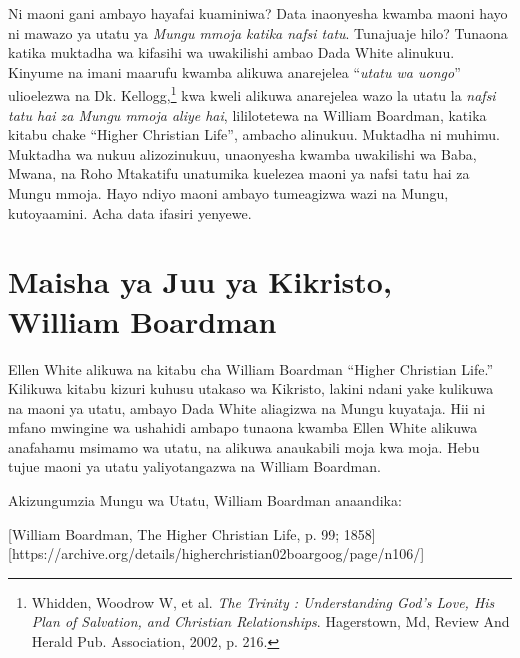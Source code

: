 Ni maoni gani ambayo hayafai kuaminiwa? Data inaonyesha kwamba maoni hayo ni mawazo ya utatu ya \textit{Mungu mmoja katika nafsi tatu}. Tunajuaje hilo? Tunaona katika muktadha wa kifasihi wa uwakilishi ambao Dada White alinukuu. Kinyume na imani maarufu kwamba alikuwa anarejelea “\textit{utatu wa uongo}” ulioelezwa na Dk. Kellogg,\footnote{Whidden, Woodrow W, et al. \textit{The Trinity : Understanding God's Love, His Plan of Salvation, and Christian Relationships}. Hagerstown, Md, Review And Herald Pub. Association, 2002, p. 216.} kwa kweli alikuwa anarejelea wazo la utatu la \textit{nafsi tatu hai za Mungu mmoja aliye hai}, lililotetewa na William Boardman, katika kitabu chake “Higher Christian Life”, ambacho alinukuu. Muktadha ni muhimu. Muktadha wa nukuu alizozinukuu, unaonyesha kwamba uwakilishi wa Baba, Mwana, na Roho Mtakatifu unatumika kuelezea maoni ya nafsi tatu hai za Mungu mmoja. Hayo ndiyo maoni ambayo tumeagizwa wazi na Mungu, kutoyaamini. Acha data ifasiri yenyewe.

\section*{Maisha ya Juu ya Kikristo, William Boardman}

Ellen White alikuwa na kitabu cha William Boardman “Higher Christian Life.” Kilikuwa kitabu kizuri kuhusu utakaso wa Kikristo, lakini ndani yake kulikuwa na maoni ya utatu, ambayo Dada White aliagizwa na Mungu kuyataja. Hii ni mfano mwingine wa ushahidi ambapo tunaona kwamba Ellen White alikuwa anafahamu msimamo wa utatu, na alikuwa anaukabili moja kwa moja. Hebu tujue maoni ya utatu yaliyotangazwa na William Boardman.

Akizungumzia Mungu wa Utatu, William Boardman anaandika:

[William Boardman, The Higher Christian Life, p. 99; 1858][https://archive.org/details/higherchristian02boargoog/page/n106/]

